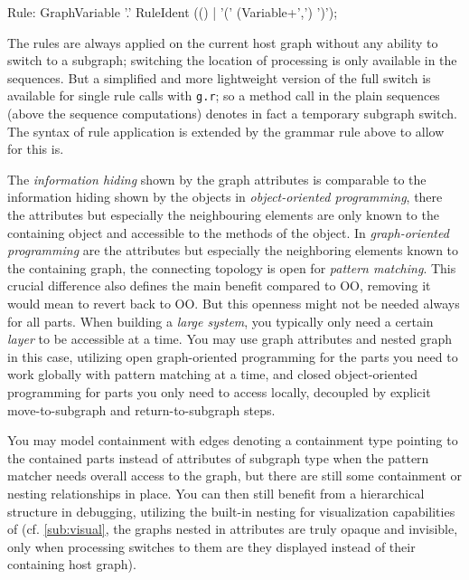 \begin{rail}
  Rule: GraphVariable '.' RuleIdent (() | '(' (Variable+',') ')');
\end{rail}

The rules are always applied on the current host graph without any ability to switch to a subgraph;
switching the location of processing is only available in the sequences.
But a simplified and more lightweight version of the full switch is available for single rule calls with \verb#g.r#; so a method call in the plain sequences (above the sequence computations) denotes in fact a temporary subgraph switch.
The syntax of rule application is extended by the grammar rule above to allow for this is.

The \emph{information hiding} shown by the graph attributes is comparable to the information hiding shown by the objects in \emph{object-oriented programming}, there the attributes but especially the neighbouring elements are only known to the containing object and accessible to the methods of the object.
In \emph{graph-oriented programming} are the attributes but especially the neighboring elements known to the containing graph, the connecting topology is open for \emph{pattern matching}.
This crucial difference also defines the main benefit compared to OO, removing it would mean to revert back to OO.
But this openness might not be needed always for all parts.
When building a \emph{large system}, you typically only need a certain \emph{layer} to be accessible at a time.
You may use graph attributes and nested graph in this case,
utilizing open graph-oriented programming for the parts you need to work globally with pattern matching at a time,
and closed object-oriented programming for parts you only need to access locally,
decoupled by explicit move-to-subgraph and return-to-subgraph steps.

You may model containment with edges denoting a containment type pointing to the contained parts instead of attributes of subgraph type
when the pattern matcher needs overall access to the graph, but there are still some containment or nesting relationships in place.
You can then still benefit from a hierarchical structure in debugging, utilizing the built-in nesting for visualization capabilities of \GrG (cf. \ref{sub:visual}, the graphs nested in attributes are truly opaque and invisible, only when processing switches to them are they displayed instead of their containing host graph).

